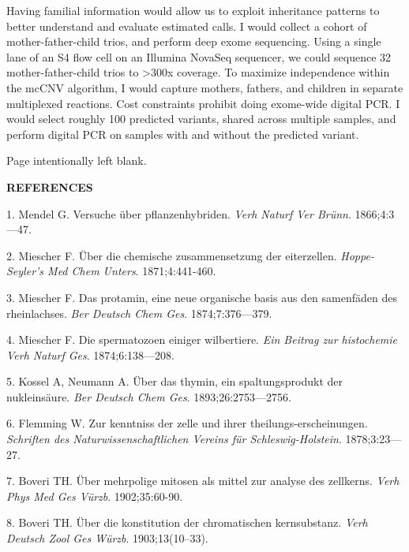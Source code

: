\documentclass[11pt,letterpaper]{book}
\makeatletter
\newcommand*{\blankpage}{%
\vspace*{\fill}
{\centering Page intentionally left blank. \par}
\vspace{\fill}}
\renewcommand*{\cleardoublepage}{\clearpage\if@twoside \ifodd\c@page\else
\blankpage
\thispagestyle{empty}
\newpage
\if@twocolumn\hbox{}\newpage\fi\fi\fi}
\newcommand{\myonein}[1]{
\begin{center}
\bfseries\Large\MakeUppercase{#1}
\end{center}
}
\makeatother
\begin{document}
Having familial information would allow us to exploit inheritance patterns to better understand and evaluate estimated calls.
I would collect a cohort of mother-father-child trios, and perform deep exome sequencing.
Using a single lane of an S4 flow cell on an Illumina NovaSeq sequencer, we could sequence 32 mother-father-child trios to \textgreater300x coverage.
To maximize independence within the mcCNV algorithm, I would capture mothers, fathers, and children in separate multiplexed reactions.
Cost constraints prohibit doing exome-wide digital PCR.
I would select roughly 100 predicted variants, shared across multiple samples, and perform digital PCR on samples with and without the predicted variant.

\backmatter

\setlength{\parindent}{0ex}
\cleardoublepage
{}
{}
\myonein{REFERENCES}

\hypertarget{refs}{}
\leavevmode\hypertarget{ref-mendel:1866aa}{}%
1. Mendel G. Versuche über pflanzenhybriden. \emph{Verh Naturf Ver Brünn}. 1866;4:3---47.

\leavevmode\hypertarget{ref-miescher:1871aa}{}%
2. Miescher F. Über die chemische zusammensetzung der eiterzellen. \emph{Hoppe-Seyler's Med Chem Unters}. 1871;4:441-460.

\leavevmode\hypertarget{ref-miescher:1874aa}{}%
3. Miescher F. Das protamin, eine neue organische basis aus den samenfäden des rheinlachses. \emph{Ber Deutsch Chem Ges}. 1874;7:376---379.

\leavevmode\hypertarget{ref-miescher:1874ab}{}%
4. Miescher F. Die spermatozoen einiger wilbertiere. \emph{Ein Beitrag zur histochemie Verh Naturf Ges}. 1874;6:138---208.

\leavevmode\hypertarget{ref-kossel:1893aa}{}%
5. Kossel A, Neumann A. Über das thymin, ein spaltungsprodukt der nukleinsäure. \emph{Ber Deutsch Chem Ges}. 1893;26:2753---2756.

\leavevmode\hypertarget{ref-flemming:1878aa}{}%
6. Flemming W. Zur kenntniss der zelle und ihrer theilungs-erscheinungen. \emph{Schriften des Naturwissenschaftlichen Vereins für Schleswig-Holstein}. 1878;3:23---27.

\leavevmode\hypertarget{ref-boveri:1902aa}{}%
7. Boveri TH. Über mehrpolige mitosen als mittel zur analyse des zellkerns. \emph{Verh Phys Med Ges Vürzb}. 1902;35:60-90.

\leavevmode\hypertarget{ref-boveri:1903aa}{}%
8. Boveri TH. Über die konstitution der chromatischen kernsubstanz. \emph{Verh Deutsch Zool Ges Würzb}. 1903;13(10--33).
\end{document}
